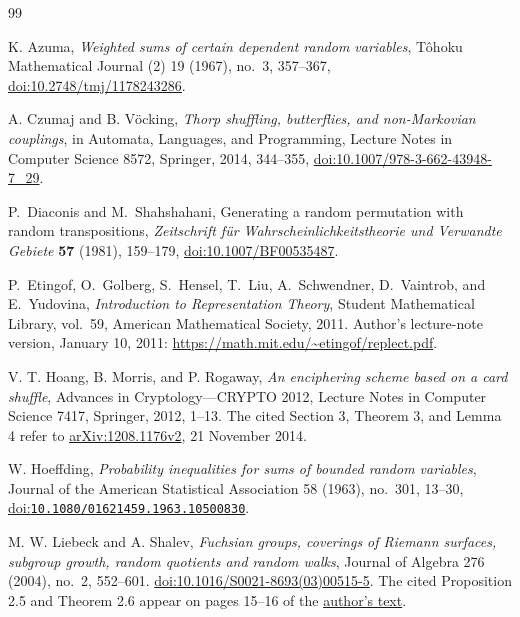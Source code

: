 \begin{thebibliography}{99}

K. Azuma,
\emph{Weighted sums of certain dependent random variables},
T\^ohoku Mathematical Journal (2) 19 (1967), no.~3, 357--367,
\href{https://doi.org/10.2748/tmj/1178243286}{doi:10.2748/tmj/1178243286}.

A. Czumaj and B. V\"ocking,
\emph{Thorp shuffling, butterflies, and non-Markovian couplings},
in Automata, Languages, and Programming, Lecture Notes in Computer
Science 8572, Springer, 2014, 344--355,
\href{https://doi.org/10.1007/978-3-662-43948-7_29}{doi:10.1007/978-3-662-43948-7\_29}.

P.~Diaconis and M.~Shahshahani,
Generating a random permutation with random transpositions,
\emph{Zeitschrift f\"ur Wahrscheinlichkeitstheorie und Verwandte Gebiete}
\textbf{57} (1981), 159--179,
\href{https://doi.org/10.1007/BF00535487}{doi:10.1007/BF00535487}.

P.~Etingof, O.~Golberg, S.~Hensel, T.~Liu, A.~Schwendner,
D.~Vaintrob, and E.~Yudovina,
\emph{Introduction to Representation Theory},
Student Mathematical Library, vol.~59, American Mathematical Society,
2011.
Author's lecture-note version, January 10, 2011:
\url{https://math.mit.edu/~etingof/replect.pdf}.

V. T. Hoang, B. Morris, and P. Rogaway,
\emph{An enciphering scheme based on a card shuffle},
Advances in Cryptology---CRYPTO 2012,
Lecture Notes in Computer Science 7417, Springer, 2012, 1--13.
The cited Section 3, Theorem 3, and Lemma 4 refer to
\href{https://arxiv.org/abs/1208.1176v2}{arXiv:1208.1176v2},
21 November 2014.

W. Hoeffding,
\emph{Probability inequalities for sums of bounded random variables},
Journal of the American Statistical Association 58 (1963), no.~301, 13--30,
\href{https://doi.org/10.1080/01621459.1963.10500830}{doi:\nolinkurl{10.1080/01621459.1963.10500830}}.

M. W. Liebeck and A. Shalev,
\emph{Fuchsian groups, coverings of Riemann surfaces, subgroup growth,
random quotients and random walks},
Journal of Algebra 276 (2004), no.~2, 552--601.
\href{https://doi.org/10.1016/S0021-8693(03)00515-5}
{doi:10.1016/S0021-8693(03)00515-5}.
The cited Proposition 2.5 and Theorem 2.6 appear on pages 15--16
of the \href{https://spiral.imperial.ac.uk/handle/10044/1/82}{author's text}.


\end{thebibliography}
